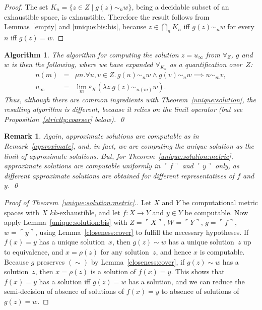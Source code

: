\documentclass[10pt]{article}
\newcommand{\godel}[1]{\ulcorner #1 \urcorner}
\newtheorem{Alg}[cor]{Algorithm}
\newtheorem{Rem}[cor]{Remark}
\newenvironment{algorithm}{\begin{Alg}\em}{\end{Alg}}
\newenvironment{rem}{\begin{Rem}\em}{\end{Rem}}
\begin{document}
\begin{proof}
  The set $K_n = \{ z \in Z \mid g(z) \sim_n w\}$, being a decidable
  subset of an exhaustible space, is exhaustible.  Therefore the
  result follows from Lemmas~\ref{empty} and \ref{unique:bis:bis}, because $z
  \in \bigcap_n K_n$ iff $g(z) \sim_n w$ for every~$n$ iff $g(z) = w$.
\end{proof}
\begin{algorithm}
The algorithm for computing the solution $z = u_\infty$ from
$\forall_Z$, $g$ and $w$ is then the following, where we have expanded
$\forall_{K_n}$ as a quantification over~$Z$:
\begin{eqnarray*}
n(m) & = & \mu n. \forall u,v \in Z.\, g(u) \sim_n w \wedge g(v) \sim_n w \implies u \sim_m v,\\
u_\infty & = & \lim_m \varepsilon_K(\lambda z.g(z) \sim_{n(m)} w).
\end{eqnarray*}
Thus, although there are common ingredients with
Theorem~\ref{unique:solution}, the resulting algorithm is different,
because it relies on the limit operator (but see
Proposition~\ref{strictly:coarser} below). \qed
\end{algorithm}

\begin{rem} \label{approximate:bis}
Again, approximate solutions are computable as in
Remark~\ref{approximate}, and, in fact, we are computing the unique
solution as the limit of approximate solutions.  But, for
Theorem~\ref{unique:solution:metric}, approximate solutions are
computable uniformly in $\godel{f}$ and $\godel{y}$ only, as different
approximate solutions are obtained for different representatives of
$f$ and $y$. \qed
\end{rem}

\begin{proof}[Proof of Theorem~\ref{unique:solution:metric}.]
  Let $X$ and $Y$ be computational metric spaces with $X$
  $kk$-exhaustible, and let $f\colon X \to Y$ and $y \in Y$ be
  computable.  Now apply Lemma~\ref{unique:solution:bis} with
  $Z=\godel{X}$, $W=\godel{Y}$, $g=\godel{f}$, $w=\godel{y}$, using
  Lemma~\ref{closeness:cover} to fulfill the necessary hypotheses.  If
  $f(x)=y$ has a unique solution~$x$, then $g(z) \sim w$ has a unique
  solution~$z$ up to equivalence, and $x=\rho(z)$ for any
  solution~$z$, and hence $x$ is computable. Because $g$ preserves
  $(\sim)$ by Lemma~\ref{closeness:cover}, if $g(z) \sim w$ has a
  solution~$z$, then $x=\rho(z)$ is a solution of $f(x)=y$.  This
  shows that $f(x)=y$ has a solution iff $g(z)=w$ has a solution, and
  we can reduce the semi-decision of absence of solutions of $f(x)=y$
  to absence of solutions of $g(z)=w$.
\end{proof}
\end{document}
